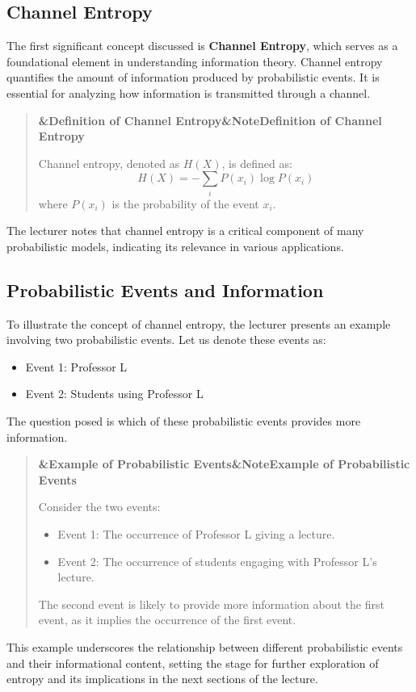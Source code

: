 \documentclass[a4paper]{article}
\newcommand{\boxheading}[1]{%
  \par\smallskip
  \noindent\textbf{\ifx&#1&Note\else#1\fi}\par
  \smallskip
}
\newenvironment{defbox}[1][]{%
  \begin{quote}\color{green!40!black}\boxheading{#1}\normalcolor
}{\end{quote}}
\newenvironment{exbox}[1][]{%
  \begin{quote}\color{brown!70!black}\boxheading{#1}\normalcolor
}{\end{quote}}
\begin{document}
\subsection{Channel Entropy}
The first significant concept discussed is \textbf{Channel Entropy}, which serves as a foundational element in understanding information theory. Channel entropy quantifies the amount of information produced by probabilistic events. It is essential for analyzing how information is transmitted through a channel.

\begin{defbox}[Definition of Channel Entropy]
Channel entropy, denoted as \( H(X) \), is defined as:
\[
H(X) = -\sum_{i} P(x_i) \log P(x_i)
\]
where \( P(x_i) \) is the probability of the event \( x_i \).
\end{defbox}

The lecturer notes that channel entropy is a critical component of many probabilistic models, indicating its relevance in various applications.

\subsection{Probabilistic Events and Information}
To illustrate the concept of channel entropy, the lecturer presents an example involving two probabilistic events. Let us denote these events as:
\begin{itemize}
    \item Event 1: Professor L
    \item Event 2: Students using Professor L
\end{itemize}
The question posed is which of these probabilistic events provides more information. 

\begin{exbox}[Example of Probabilistic Events]
Consider the two events:
\begin{itemize}
    \item Event 1: The occurrence of Professor L giving a lecture.
    \item Event 2: The occurrence of students engaging with Professor L's lecture.
\end{itemize}
The second event is likely to provide more information about the first event, as it implies the occurrence of the first event.
\end{exbox}

This example underscores the relationship between different probabilistic events and their informational content, setting the stage for further exploration of entropy and its implications in the next sections of the lecture.
\end{document}
